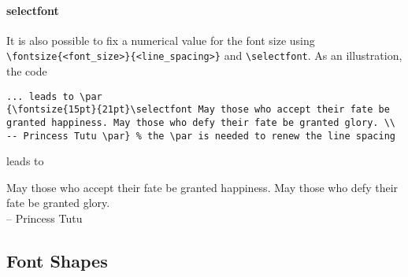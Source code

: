 \paragraph{selectfont} It is also possible to fix a numerical value for the font size using \texttt{\textbackslash fontsize\{<font\_size>\}\{<line\_spacing>\}} and \texttt{\textbackslash selectfont}. As an illustration, the code
\begin{lstlisting}
... leads to \par
{\fontsize{15pt}{21pt}\selectfont May those who accept their fate be granted happiness. May those who defy their fate be granted glory. \\
-- Princess Tutu \par} % the \par is needed to renew the line spacing
\end{lstlisting}
leads to \par
{\fontsize{15pt}{21pt}\selectfont May those who accept their fate be granted happiness. May those who defy their fate be granted glory. \\
-- Princess Tutu \par}

\subsection{Font Shapes}

